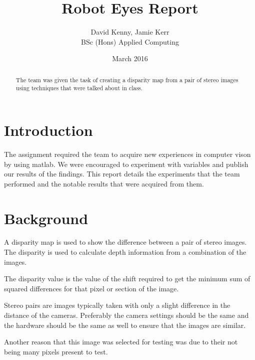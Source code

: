 \documentclass[twocolumn]{article}
\title{Robot Eyes Report}
\author{David Kenny, Jamie Kerr\\BSc (Hons) Applied Computing}
\date{March 2016}
\begin{document}
\maketitle


\begin{abstract}

The team was given the task of creating a disparity map from a pair of stereo images using techniques that were talked about in class. 

\end{abstract}


\section{Introduction}
\vspace{-1ex}

The assignment required the team to acquire new experiences in computer vison by using matlab. We were encouraged to experiment with variables and publish our results of the findings. This report details the experiments that the team performed and the notable results that were acquired from them. 


\section{Background}
\vspace{-1ex}

A disparity map \cite{disparitymap} is used to show the difference between a pair of stereo images. The disparity is used to calculate depth information from a combination of the images. 

The disparity value is the value of the shift required to get the minimum sum of squared differences \cite{introssd} for that pixel or section of the image. 

Stereo pairs are images typically taken with only a slight difference in the distance of the cameras. Preferably the camera settings should be the same and the hardware should be the same as well to ensure that the images are similar. 

Another reason that this image was selected for testing was due to their not being many pixels present to test.

\end{document}
